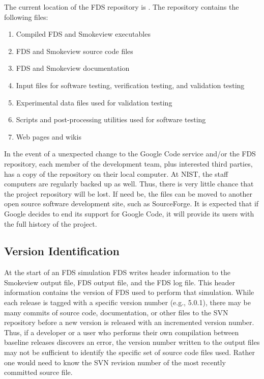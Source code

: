 \documentclass[11pt]{book}
\begin{document}
The current location of the FDS repository is \href{http://fds-smv.googlecode.com/svn/trunk/}
{}. The repository contains the following files:
\begin{enumerate}
\item Compiled FDS and Smokeview executables
\item FDS and Smokeview source code files
\item FDS and Smokeview documentation
\item Input files for software testing, verification testing, and validation testing
\item Experimental data files used for validation testing
\item Scripts and post-processing utilities used for software testing
\item Web pages and wikis
\end{enumerate}

In the event of a unexpected change to the Google Code service and/or the FDS repository, each member of the development team, plus interested third parties, has a copy of the repository on their local computer. At NIST, the staff computers are regularly backed up as well. Thus, there is very little chance that the project repository will be lost. If need be, the files can be moved to another open source software development site, such as SourceForge. It is expected that if Google decides to end its support for Google Code, it will provide its users with the full history of the project.

\subsection{Version Identification}

At the start of an FDS simulation FDS writes header information to the Smokeview output file, FDS output file,
and the FDS log file.  This header information contains the version of FDS used to perform that simulation.
While each release is tagged with a specific version number (e.g., 5.0.1), there may be many commits of source
code, documentation, or other files to the SVN repository before a new version is released with an incremented
version number.  Thus, if a developer or a user who performs their own compilation between baseline releases
discovers an error, the version number written to the output files may not be sufficient to identify the
specific set of source code files used.  Rather one would need to know the SVN revision number of the most
recently committed source file.
\end{document}
